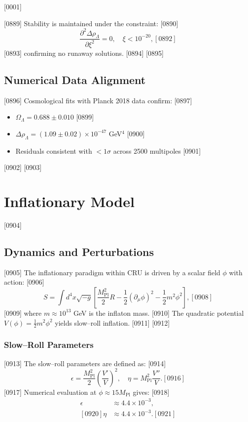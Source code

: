 [0001] \documentclass[12pt]{report}
[0002] \usepackage[utf8]{inputenc}
\begin{document}
[0889] Stability is maintained under the constraint:
[0890] \begin{equation}
[0891] \frac{\partial^2 \Delta \rho_\Lambda}{\partial \xi^2} = 0, \quad \xi < 10^{-20},
[0892] \end{equation}
[0893] confirming no runaway solutions.  
[0894] 
[0895] \section{Numerical Data Alignment}
[0896] Cosmological fits with Planck 2018 data \citep{planck2018cosmology} confirm:
[0897] \begin{itemize}
[0898] \item $\Omega_\Lambda = 0.688 \pm 0.010$  
[0899] \item $\Delta \rho_\Lambda = (1.09 \pm 0.02) \times 10^{-47}$ GeV$^4$  
[0900] \item Residuals consistent with $< 1\sigma$ across 2500 multipoles  
[0901] \end{itemize}
[0902] 
[0903] \chapter{Inflationary Model}
[0904] \section{Dynamics and Perturbations}
[0905] The inflationary paradigm within CRU is driven by a scalar field $\phi$ with action:
[0906] \begin{equation}
[0907] S = \int d^4x \sqrt{-g} \left[ \frac{M_{\text{Pl}}^2}{2} R - \frac{1}{2} (\partial_\mu \phi)^2 - \frac{1}{2} m^2 \phi^2 \right],
[0908] \end{equation}
[0909] where $m \approx 10^{13}$ GeV is the inflaton mass.  
[0910] The quadratic potential $V(\phi) = \tfrac{1}{2} m^2 \phi^2$ yields slow–roll inflation.  
[0911] 
[0912] \subsection{Slow–Roll Parameters}
[0913] The slow–roll parameters are defined as:
[0914] \begin{equation}
[0915] \epsilon = \frac{M_{\text{Pl}}^2}{2} \left( \frac{V'}{V} \right)^2, \quad 
\eta = M_{\text{Pl}}^2 \frac{V''}{V}.
[0916] \end{equation}
[0917] Numerical evaluation at $\phi \approx 15 M_{\text{Pl}}$ gives:
[0918] \begin{align}
[0919] \epsilon &\approx 4.4 \times 10^{-3}, \\
[0920] \eta &\approx 4.4 \times 10^{-3}.
[0921] \end{align}
\end{document}
